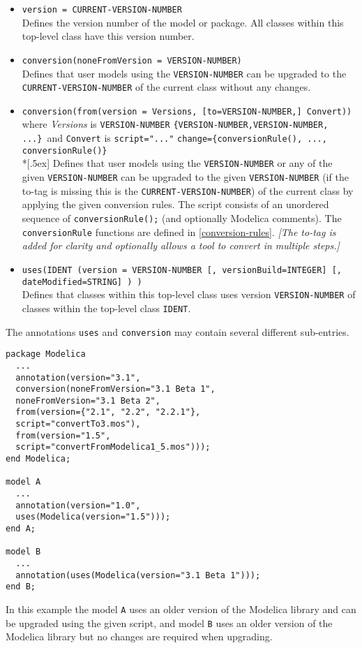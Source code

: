 \begin{itemize}
\item
  \lstinline!version = CURRENT-VERSION-NUMBER!\\
  Defines the version number of the model or package. All classes within
  this top-level class have this version number.
\item
  \lstinline!conversion(noneFromVersion = VERSION-NUMBER)!\\
  Defines that user models using the \lstinline!VERSION-NUMBER! can be upgraded to
  the \lstinline!CURRENT-VERSION-NUMBER! of the current class without any changes.
\item
  \lstinline!conversion(from(version = Versions, [to=VERSION-NUMBER,] Convert))!\\
  where \emph{Versions} is \lstinline!VERSION-NUMBER! \textbar{}
   \lstinline!{VERSION-NUMBER,VERSION-NUMBER, ...}!\
  and \lstinline!Convert! is \lstinline!script="..."! \textbar{}
   \lstinline!change={conversionRule(), ..., conversionRule()}!\\*[.5ex]
  Defines that user models using the \lstinline!VERSION-NUMBER! or any of the given
  \lstinline!VERSION-NUMBER! can be upgraded to the given \lstinline!VERSION-NUMBER! (if the
  to-tag is missing this is the \lstinline!CURRENT-VERSION-NUMBER!) of the current
  class by applying the given conversion rules. The script consists of
  an unordered sequence of  \lstinline!conversionRule();! (and optionally Modelica
  comments). The  \lstinline!conversionRule! functions are defined in \autoref{conversion-rules}.
  \emph{{[}The to-tag is added for clarity and optionally allows a tool
  to convert in multiple steps.{]}}
\item
  \lstinline!uses(IDENT (version = VERSION-NUMBER [, versionBuild=INTEGER] [, dateModified=STRING] ) )!\\
  Defines that classes within this top-level class uses version
  \lstinline!VERSION-NUMBER! of classes within the top-level class \lstinline!IDENT!.
\end{itemize}

The annotations \lstinline!uses! and \lstinline!conversion! may contain several different
sub-entries.

\begin{example}
\begin{lstlisting}[language=modelica]
package Modelica
  ...
  annotation(version="3.1",
  conversion(noneFromVersion="3.1 Beta 1",
  noneFromVersion="3.1 Beta 2",
  from(version={"2.1", "2.2", "2.2.1"},
  script="convertTo3.mos"),
  from(version="1.5",
  script="convertFromModelica1_5.mos")));
end Modelica;

model A
  ...
  annotation(version="1.0",
  uses(Modelica(version="1.5")));
end A;

model B
  ...
  annotation(uses(Modelica(version="3.1 Beta 1")));
end B;
\end{lstlisting}
In this example the model \lstinline!A! uses an older version of the
Modelica library and can be upgraded using the given script, and model
\lstinline!B! uses an older version of the Modelica library but no changes are
required when upgrading.
\end{example}

